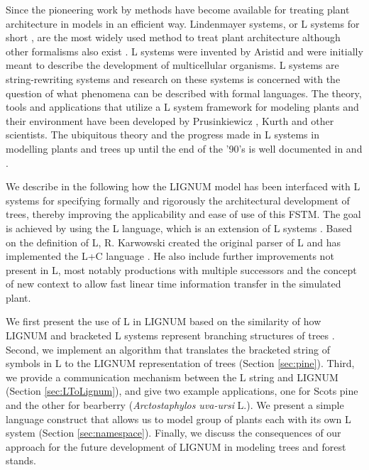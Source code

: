 Since  the pioneering  work  by \citet{honda:71}  methods have  become
available for  treating plant architecture  in models in  an efficient
way.  Lindenmayer  systems, or L systems for  short \citep{pp:89}, are
the most widely used method to treat plant architecture although other
formalisms    also   exist    \citep[e.g.][]{dereffye:97,   godin:99}.
L systems    were   invented    by    Aristid   \citet{lindenmayer:68,
lindenmayer:71} and  were initially meant to  describe the development
of  multicellular organisms.  L  systems are  string-rewriting systems
and research on  these systems is concerned with  the question of what
phenomena can  be described with formal languages.   The theory, tools
and applications that utilize a L system framework for modeling plants
and   their   environment  have   been   developed  by   Prusinkiewicz
\citep{pp:89,pp:92}, Kurth \citep{kurth:94} and other scientists.  The
ubiquitous  theory and  the progress  made in  L systems  in modelling
plants and trees  up until the end of the '90's  is well documented in
\citet{pp:90,pp:99} and \citet{kurth:99}.

We describe in the following  how the LIGNUM model has been interfaced
with   L  systems   for   specifying  formally   and  rigorously   the
architectural   development   of    trees,   thereby   improving   the
applicability and ease  of use of this FSTM.  The  goal is achieved by
using   the  L   language,  which   is  an   extension   of  L systems
\citep{pp:99a}.  Based  on the definition of L,  R.  Karwowski created
the  original  parser  of  L  and has  implemented  the  L+C  language
\citep{karwowski:02}. He also include further improvements not present
in  L,  most notably  productions  with  multiple  successors and  the
concept of new context  \citep{karwowski:03} to allow fast linear time
information transfer in the simulated plant.

We first present the use of L in LIGNUM based on the similarity of how
LIGNUM and bracketed L systems represent branching structures of trees
\citep{perttunen:96, perttunen:01}.  Second, we implement an algorithm
that translates  the bracketed  string of symbols  in L to  the LIGNUM
representation of trees (Section \ref{sec:pine}).  Third, we provide a
communication  mechanism  between the  L  string  and LIGNUM  (Section
\ref{sec:LToLignum}), and give two example applications, one for Scots
pine  and the  other for  bearberry  (\textit{Arctostaphylos uva-ursi}
L.).  We present  a simple language construct that  allows us to model
group   of   plants   each    with   its   own   L   system   (Section
\ref{sec:namespace}).   Finally, we  discuss the  consequences  of our
approach for  the future development  of LIGNUM in modeling  trees and
forest stands.

